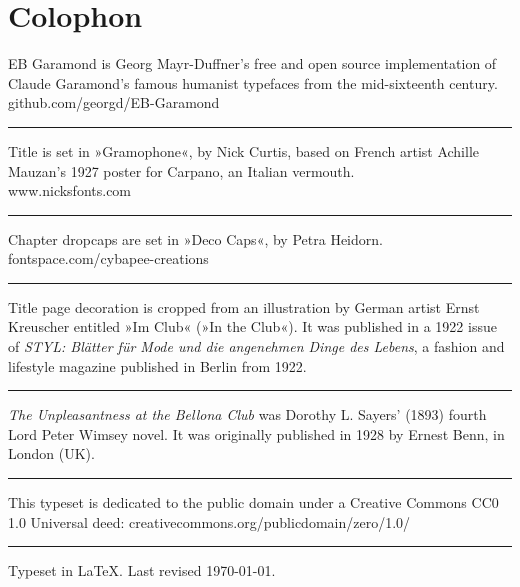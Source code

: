 \documentclass[
paper=5.5in:8.5in,
BCOR=7mm,
twoside,
DIV=calc,
11pt,
usegeometry,
chapterprefix,
headings=big]{scrbook} %
\begin{document}
\pagestyle{plain}

\renewcommand*\raggedchapter{\centering}





\tableofcontents
\enlargethispage{1.5\baselineskip}
\clearpage








\mainmatter
\pagestyle{headings}
\renewcommand*{\chapterpagestyle}{plain}


























\clearpage
{}
\chapter*{Colophon}
\begin{center}
EB Garamond is Georg Mayr-Duffner's free and open source implementation of Claude Garamond’s famous humanist typefaces from the mid-sixteenth century.\\github.com/georgd/EB-Garamond
\vfill
\rule{0.5\textwidth}{.4pt}
\vfill
Title is set in »Gramophone«, by Nick Curtis, based on French artist Achille Mauzan’s 1927 poster for Carpano, an Italian vermouth.\\www.nicksfonts.com
\vfill
\rule{0.5\textwidth}{.4pt}
\vfill
Chapter dropcaps are set in »Deco Caps«, by Petra Heidorn.\\fontspace.com/cybapee-creations
\vfill
\rule{0.5\textwidth}{.4pt}
\vfill
Title page decoration is cropped from an illustration by German artist Ernst Kreuscher entitled »Im Club« (»In the Club«). It was published in a 1922 issue of \textit{STYL: Blätter für Mode und die angenehmen Dinge des Lebens}, a fashion and lifestyle magazine published in Berlin from 1922.
\vfill
\rule{0.5\textwidth}{.4pt}
\vfill
\textit{The Unpleasantness at the Bellona Club} was Dorothy L. Sayers' (1893) fourth Lord Peter Wimsey novel. It was originally published in 1928 by Ernest Benn, in London (UK).
\vfill
\rule{0.5\textwidth}{.4pt}
\vfill
This typeset is dedicated to the public domain under a Creative Commons CC0 1.0 Universal deed: creativecommons.org/publicdomain/zero/1.0/
\vfill
\rule{0.5\textwidth}{.4pt}
\vfill
Typeset in \LaTeX{}. Last revised \today.
\end{center}
\thispagestyle{empty}
\end{document}
